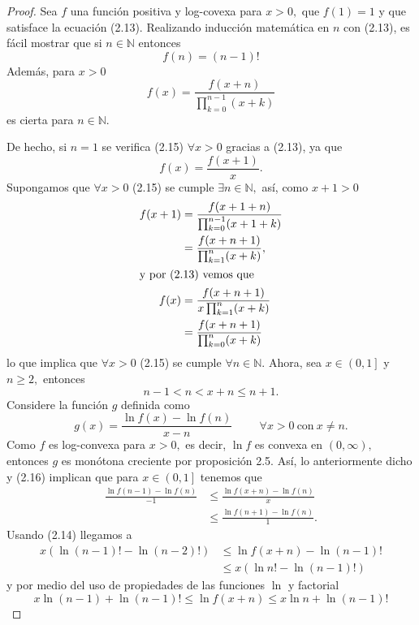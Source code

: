 \begin{proof}
	Sea $f$ una función positiva y log-covexa para $x > 0,$ que $f(1) = 1$ y que satisface la ecuación (2.13). Realizando inducción matemática en $n$ con (2.13), es fácil mostrar que si $n \in \mathbb{N}$ entonces
	\begin{equation}
	f(n) = (n-1)!
	\end{equation}
	Además, para $x > 0$
	\begin{equation}
	f(x) = \frac{f(x+n)}{\prod_{k = 0}^{n-1}(x+k)}
	\end{equation}
	es cierta para $n \in \mathbb{N}.$
	
	De hecho, si $n = 1$ se verifica (2.15) $\forall x > 0$ gracias a (2.13), ya que $$f(x) = \frac{f(x+1)}{x}.$$ Supongamos que $\forall x > 0$ (2.15) se cumple $\exists n \in \mathbb{N},$ así, como $x+1 > 0$
	\begin{align*}
	f(x+1) &= \frac{f(x+1+n)}{\prod_{k = 0}^{n-1}(x+1+k)}\\
	&= \frac{f(x+n+1)}{\prod_{k = 1}^{n}(x+k)},\\
	\intertext{y por (2.13) vemos que}
	f(x) &= \frac{f(x+n+1)}{x\prod_{k = 1}^{n}(x+k)}\\
	&= \frac{f(x+n+1)}{\prod_{k = 0}^{n}(x+k)}
	\end{align*}
	lo que implica que $\forall x > 0$ (2.15) se cumple $\forall n \in \mathbb{N}.$
	Ahora, sea $x \in \left(0,1\right]$ y $n \geq 2,$ entonces
	\begin{equation}
	n-1 < n < x+n \leq n+1.
	\end{equation}
	Considere la función $g$ definida como $$g(x) = \frac{\ln f(x)-\ln f(n)}{x-n}\hspace{1cm}\forall x > 0\ \textrm{con}\ x \neq n.$$
	Como $f$ es log-convexa para $x > 0,$ es decir, $\ln f$ es convexa en $(0,\infty),$ entonces $g$ es monótona creciente por proposición 2.5. Así, lo anteriormente dicho y (2.16) implican que para $x \in \left(0,1\right]$ tenemos que
	\begin{align*}
	\frac{\ln f(n-1)-\ln f(n)}{-1} &\leq \frac{\ln f(x+n)-\ln f(n)}{x}\\
	&\leq \frac{\ln f(n+1)-\ln f(n)}{1}.
	\end{align*}
	Usando (2.14) llegamos a
	\begin{align*}
	x(\ln (n-1)!-\ln (n-2)!) &\leq \ln f(x+n)-\ln (n-1)!\\
	&\leq x(\ln n!-\ln (n-1)!)
	\end{align*}
	y por medio del uso de propiedades de las funciones $\ln$ y factorial $$x\ln (n-1)+\ln (n-1)! \leq \ln f(x+n) \leq x\ln n + \ln (n-1)!$$

\end{proof}
